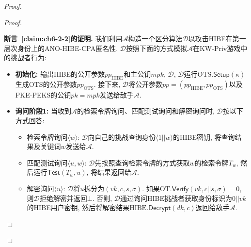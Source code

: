 \begin{proof}
\begin{proof}
\begin{trivlist}
\end{trivlist}

\begin{trivlist}\itemsep 1pt \parskip 0pt \parsep 0pt
\item \textbf{断言~\ref{claim:ch6-2-2}的证明.} 我们利用$\mathcal{A}$构造一个区分算法$\mathcal{D}$以攻击HIBE在第一层次身份上的ANO-HIBE-CPA匿名性. $\mathcal{D}$按照下面的方式模拟$\mathcal{A}$在KW-Priv游戏中的挑战者行为: 
\begin{itemize}
	\item \textbf{初始化:} 输出HIBE的公开参数$pp_{\text{HIBE}}$和主公钥$mpk$, $\mathcal{D}$, $\mathcal{D}$运行$\text{OTS}.\mathsf{Setup}(\kappa)$生成OTS的公开参数$pp_{\text{OTS}}$. 接下来, $\mathcal{D}$将公开参数$pp = (pp_{\text{HIBE}}, pp_{\text{OTS}})$以及PKE-PEKS的公钥$pk = mpk$发送给敌手$\mathcal{A}$.

	\item \textbf{询问阶段1:} 当收到$\mathcal{A}$的检索令牌询问、匹配测试询问和解密询问时, $\mathcal{D}$按以下方式回答: \vspace{-0.5em}
		\begin{itemize} \itemsep 1pt \parskip 0pt \parsep 0pt
			\item 检索令牌询问$\langle w \rangle$: $\mathcal{D}$向自己的挑战查询身份$\langle 1||w \rangle$的HIBE密钥, 将查询结果及关键词$w$发送给$\mathcal{A}$.

			\item 匹配测试询问$\langle u, w \rangle$: $\mathcal{D}$先按照查询检索令牌的方式获取$w$的检索令牌$T_w$, 然后运行$\mathsf{Test}(T_w, u)$, 将结果返回给$\mathcal{A}$.

			\item 解密询问$\langle u \rangle$: $\mathcal{D}$将$u$拆分为$(vk, c, s, \sigma)$.
				如果$\text{OT}.\mathsf{Verify}(vk, c||s, \sigma) = 0$,
				则$\mathcal{D}$拒绝解密并返回$\bot$. 否则, $\mathcal{D}$通过询问HIBE挑战者获取身份标识为$0||vk$的HIBE用户密钥, 然后将解密结果$\text{HIBE}.\mathsf{Decrypt}(dk, c)$返回给敌手$\mathcal{A}$.
		\end{itemize}


\end{itemize}
\end{trivlist}
\end{proof}
\end{proof}
